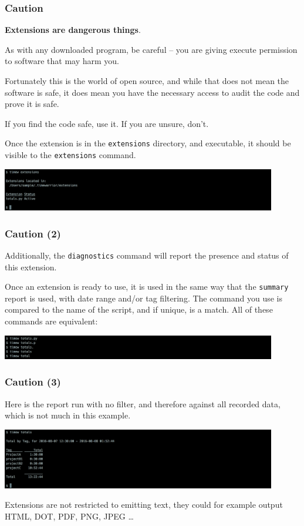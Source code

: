 \documentclass[t,handout]{beamer}
\begin{document}
\begin{frame}[fragile]\frametitle{Caution}
    \textbf{Extensions are dangerous things}.

    As with any downloaded program, be careful -- you are giving execute permission to software that may harm you.

    Fortunately this is the world of open source, and while that does not mean the software is safe, it does mean you have the necessary access to audit the code and prove it is safe.

    If you find the code safe, use it. If you are unsure, don't.

    Once the extension is in the \verb=extensions= directory, and executable, it should be visible to the \verb=extensions= command.

    \includegraphics[width=12cm]{images/tutorial46.png}
\end{frame}

\begin{frame}[fragile]\frametitle{Caution (2)}
    Additionally, the \verb=diagnostics= command will report the presence and status of this extension.

    Once an extension is ready to use, it is used in the same way that the \verb=summary= report is used, with date range and/or tag filtering. The command you use is compared to the name of the script, and if unique, is a match. All of these commands are equivalent:

    \includegraphics[width=12cm]{images/tutorial47.png}
\end{frame}

\begin{frame}[fragile]\frametitle{Caution (3)}
    Here is the report run with no filter, and therefore against all recorded data, which is not much in this example.

    \includegraphics[width=12cm]{images/tutorial48.png}

    Extensions are not restricted to emitting text, they could for example output HTML, DOT, PDF, PNG, JPEG \ldots
\end{frame}
\end{document}
